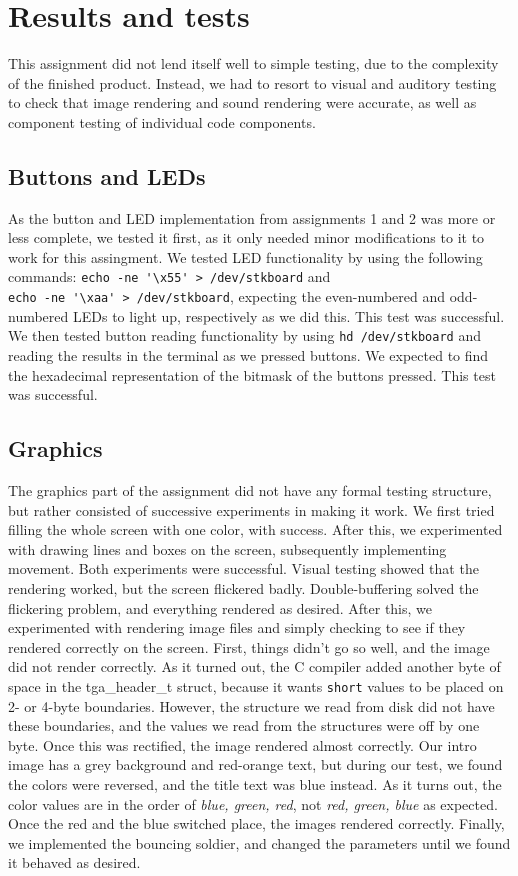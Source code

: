 \section{Results and tests}
This assignment did not lend itself well to simple testing, due to the
complexity of the finished product. Instead, we had to resort to visual
and auditory testing to check that image rendering and sound rendering
were accurate, as well as component testing of individual code
components.

\subsection{Buttons and LEDs}
As the button and LED implementation from assignments 1 and 2 was more
or less complete, we tested it first, as it only needed minor
modifications to it to work for this assingment.  We tested LED
functionality by using the following commands: 
\verb|echo -ne '\x55' > /dev/stkboard| and \\
\verb|echo -ne '\xaa' > /dev/stkboard|,
expecting the even-numbered and odd-numbered LEDs to light up,
respectively as we did this. This test was successful.  We then tested
button reading functionality by using \texttt{hd /dev/stkboard} and
reading the results in the terminal as we pressed buttons. We expected
to find the hexadecimal representation of the bitmask of the buttons
pressed. This test was successful.

\subsection{Graphics}
The graphics part of the assignment did not have any formal testing structure, but rather consisted of successive experiments in making it work. 
We first tried filling the whole screen with one color, with success.
After this, we experimented with drawing lines and boxes on the screen,
subsequently implementing movement. Both experiments were successful. Visual testing showed that the
rendering worked, but the screen flickered badly. Double-buffering solved the flickering problem, and everything rendered as desired.
After this, we experimented with rendering image files and simply checking to see if they rendered correctly on the screen. First, things didn't go so well, and the image did not render correctly. As it turned out, the C compiler added another byte of space in the tga_header_t struct, because it wants \texttt{short} values to be placed on 2- or 4-byte boundaries. However, the structure we read from disk did not have these boundaries, and the values we read from the structures were off by one byte. Once this was rectified, the image rendered almost correctly. Our intro image has a grey background and red-orange text, but during our test, we found the colors were reversed, and the title text was blue instead. As it turns out, the color values are in the order of \emph{blue, green, red}, not \emph{red, green, blue} as expected. Once the red and the blue switched place, the images rendered correctly.
Finally, we implemented the bouncing soldier, and changed the parameters until we found it behaved as desired.

